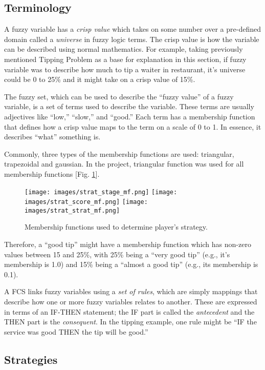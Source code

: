 \documentclass{article}
\begin{document}
\subsection{Terminology}

A fuzzy variable has a \emph{crisp value} which takes on some number over a pre-defined domain called a \emph{universe} in fuzzy logic terms. The crisp value is how the variable can be described using normal mathematics. For example, taking previously mentioned Tipping Problem as a base for explanation in this section, if fuzzy variable was to describe how much to tip a waiter in restaurant, it’s universe could be 0 to 25\% and it might take on a crisp value of 15\%.

The fuzzy set, which can be used to describe the “fuzzy value” of a fuzzy variable, is a set of terms used to describe the variable. These terms are usually adjectives like “low,” “slow,” and “good.” Each term has a membership function that defines how a crisp value maps to the term on a scale of 0 to 1. In essence, it describes “what” something is.

Commonly, three types of the membership functions are used: triangular, trapezoidal and gaussian. In the project, triangular function was used for all membership functions [Fig. \ref{fig:mf}].

\begin{figure}[tbhp]
  \centering
      \texttt{[image: images/strat\_stage\_mf.png]}
      \texttt{[image: images/strat\_score\_mf.png]}
      \texttt{[image: images/strat\_strat\_mf.png]}
  \caption{Membership functions used to determine player's strategy.}
  \label{fig:mf}
\end{figure}

Therefore, a “good tip” might have a membership function which has non-zero values between 15 and 25\%, with 25\% being a “very good tip” (e.g., it’s membership is 1.0) and 15\% being a “almost a good tip” (e.g., its membership is 0.1).

A FCS links fuzzy variables using a \emph{set of rules}, which are simply mappings that describe how one or more fuzzy variables relates to another. These are expressed in terms of an IF-THEN statement; the IF part is called the \emph{antecedent} and the THEN part is the \emph{consequent}. In the tipping example, one rule might be “IF the service was good THEN the tip will be good.”

\subsection{Strategies}
\end{document}
